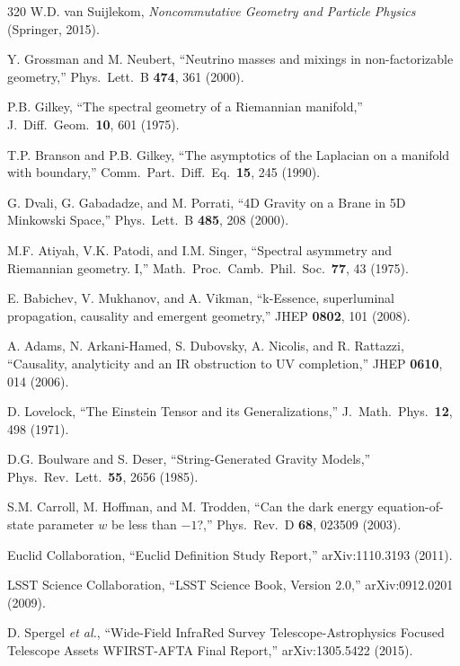 \begin{thebibliography}{320}
W.D. van Suijlekom,
\textit{Noncommutative Geometry and Particle Physics} (Springer, 2015).

Y. Grossman and M. Neubert,
``Neutrino masses and mixings in non-factorizable geometry,''
Phys.\ Lett.\ B \textbf{474}, 361 (2000).

P.B. Gilkey,
``The spectral geometry of a Riemannian manifold,''
J.\ Diff.\ Geom.\ \textbf{10}, 601 (1975).

T.P. Branson and P.B. Gilkey,
``The asymptotics of the Laplacian on a manifold with boundary,''
Comm.\ Part.\ Diff.\ Eq.\ \textbf{15}, 245 (1990).

G. Dvali, G. Gabadadze, and M. Porrati,
``4D Gravity on a Brane in 5D Minkowski Space,''
Phys.\ Lett.\ B \textbf{485}, 208 (2000).

M.F. Atiyah, V.K. Patodi, and I.M. Singer,
``Spectral asymmetry and Riemannian geometry. I,''
Math.\ Proc.\ Camb.\ Phil.\ Soc.\ \textbf{77}, 43 (1975).

E. Babichev, V. Mukhanov, and A. Vikman,
``k-Essence, superluminal propagation, causality and emergent geometry,''
JHEP \textbf{0802}, 101 (2008).

A. Adams, N. Arkani-Hamed, S. Dubovsky, A. Nicolis, and R. Rattazzi,
``Causality, analyticity and an IR obstruction to UV completion,''
JHEP \textbf{0610}, 014 (2006).

D. Lovelock,
``The Einstein Tensor and its Generalizations,''
J.\ Math.\ Phys.\ \textbf{12}, 498 (1971).

D.G. Boulware and S. Deser,
``String-Generated Gravity Models,''
Phys.\ Rev.\ Lett.\ \textbf{55}, 2656 (1985).

S.M. Carroll, M. Hoffman, and M. Trodden,
``Can the dark energy equation-of-state parameter $w$ be less than $-1$?,''
Phys.\ Rev.\ D \textbf{68}, 023509 (2003).

Euclid Collaboration,
``Euclid Definition Study Report,''
arXiv:1110.3193 (2011).

LSST Science Collaboration,
``LSST Science Book, Version 2.0,''
arXiv:0912.0201 (2009).

D. Spergel \textit{et al.},
``Wide-Field InfraRed Survey Telescope-Astrophysics Focused Telescope Assets WFIRST-AFTA Final Report,''
arXiv:1305.5422 (2015).


\end{thebibliography}
